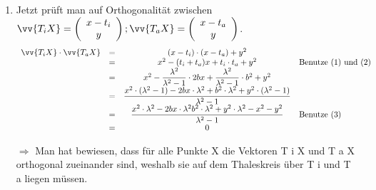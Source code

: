 \begin{small}
\begin{Beweis}
\begin{enumerate}
    \item
      Jetzt prüft man auf Orthogonalität zwischen $\vv{T_{i}X} = \left(\begin{array}{c} x-t_{i} \\ y \end{array}\right); \vv{T_{a}X} = \left(\begin{array}{c} x-t_{a} \\ y \end{array}\right)$.
      $$\begin{array}{rccl}
        \vv{T_{i}X} \cdot \vv{T_{a}X} & = & (x-t_{i})\cdot (x-t_{a}) +y^2                                                                                       & \\
                                      & = & x^2 -(t_{i} +t_{a})x + t_{i}\cdot t_{a} + y^2                                                                       & \text{Benutze (1) und (2)} \\
                                      & = & x^2 - \dfrac{\lambda^2}{\lambda^2 - 1} \cdot 2bx + \dfrac{\lambda^2}{\lambda^2 - 1} \cdot b^2 +y^2                  & \\
                                      & = & \dfrac{x^2 \cdot (\lambda^2 -1) - 2bx\cdot \lambda^2 + b^2\cdot \lambda^2 + y^2 \cdot (\lambda^2 -1)}{\lambda^2 -1} & \\
                                      & = & \dfrac{x^2 \cdot \lambda^2 - 2bx\cdot \lambda^2 b^2\cdot \lambda^2 +y^2\cdot \lambda^2 -x^2 -y^2} {\lambda^2 -1}    & \text{Benutze (3)} \\
                                      & = & 0                                                                                                                   & \\
      \end{array}$$

      $\Rightarrow$ Man hat bewiesen, dass für alle Punkte X die Vektoren T i X und T a X orthogonal zueinander sind, weshalb sie auf dem Thaleskreis über T i und T a liegen müssen.
  \end{enumerate}
\end{Beweis}



\end{small}
